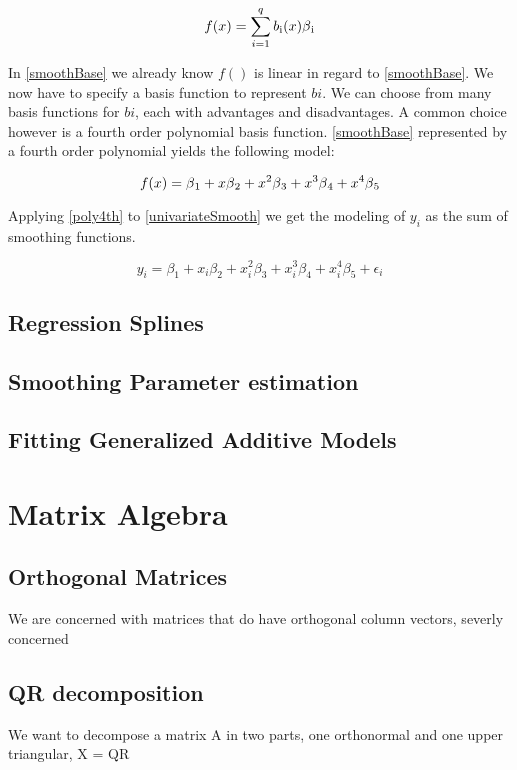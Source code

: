 \documentclass{article}
\begin{document}
    \begin{equation} \label{smoothBase} f(x) = \sum_{i=1}^{q} b\textsubscript{i} (x) \beta \textsubscript{i} \end{equation}

    In \ref{smoothBase} we already know $f()$ is linear in regard to \ref{smoothBase}. We now have to specify a basis function to represent $bi$. We can choose from many basis functions for $bi$, each with advantages and disadvantages. A common choice however is a fourth order polynomial basis function. \ref{smoothBase} represented by a fourth order polynomial yields the following model:

    \begin{equation} \label{poly4th} f(x) = \beta \textsubscript{1} + x\beta \textsubscript{2} + x^2\beta \textsubscript{3} + x^3\beta \textsubscript{4} + x^4\beta \textsubscript{5}  \end{equation}

    Applying \ref{poly4th} to \ref{univariateSmooth} we get the modeling of $y_i$ as the sum of smoothing functions.

    \begin{equation} \label{poly4thGAM}  y_i = \beta_1 + x_i\beta_2 + x_i^2\beta_3+ x_i^3\beta_4 + x_i^4\beta_5 + \epsilon_i \end{equation}
    \subsection{Regression Splines}
    \subsection{Smoothing Parameter estimation}
    \subsection{Fitting Generalized Additive Models}

    \section{Matrix Algebra}
    \subsection{Orthogonal Matrices}
    We are concerned with matrices that do have orthogonal column vectors, severly concerned
    \subsection{QR decomposition}
    We want to decompose a matrix A in two parts, one orthonormal and one upper triangular, X = QR


    \newpage


    \newpage
\end{document}
